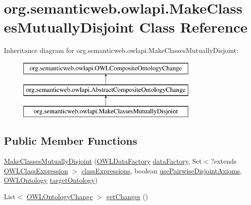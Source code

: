 \hypertarget{classorg_1_1semanticweb_1_1owlapi_1_1_make_classes_mutually_disjoint}{\section{org.\-semanticweb.\-owlapi.\-Make\-Classes\-Mutually\-Disjoint Class Reference}
\label{classorg_1_1semanticweb_1_1owlapi_1_1_make_classes_mutually_disjoint}
}
Inheritance diagram for org.\-semanticweb.\-owlapi.\-Make\-Classes\-Mutually\-Disjoint\-:\begin{figure}[H]
\begin{center}
\leavevmode
\includegraphics[height=3.000000cm]{classorg_1_1semanticweb_1_1owlapi_1_1_make_classes_mutually_disjoint}
\end{center}
\end{figure}
\subsection*{Public Member Functions}
\begin{DoxyCompactItemize}
\item 
\hyperlink{classorg_1_1semanticweb_1_1owlapi_1_1_make_classes_mutually_disjoint_a5b461cc70cf99348b88559f16c6c2e09}{Make\-Classes\-Mutually\-Disjoint} (\hyperlink{interfaceorg_1_1semanticweb_1_1owlapi_1_1model_1_1_o_w_l_data_factory}{O\-W\-L\-Data\-Factory} \hyperlink{classorg_1_1semanticweb_1_1owlapi_1_1_abstract_composite_ontology_change_aebcfd0601543ebb5f72b1fe53a5352c9}{data\-Factory}, Set$<$?extends \hyperlink{interfaceorg_1_1semanticweb_1_1owlapi_1_1model_1_1_o_w_l_class_expression}{O\-W\-L\-Class\-Expression} $>$ \hyperlink{classorg_1_1semanticweb_1_1owlapi_1_1_make_classes_mutually_disjoint_a57759e02e23e59ab2eeb7912773669bf}{class\-Expressions}, boolean \hyperlink{classorg_1_1semanticweb_1_1owlapi_1_1_make_classes_mutually_disjoint_a85748e7becd8aa020ef09bd443b3b5a3}{use\-Pairwise\-Disjoint\-Axioms}, \hyperlink{interfaceorg_1_1semanticweb_1_1owlapi_1_1model_1_1_o_w_l_ontology}{O\-W\-L\-Ontology} \hyperlink{classorg_1_1semanticweb_1_1owlapi_1_1_make_classes_mutually_disjoint_af9da9ae856c808194f95400759c74d58}{target\-Ontology})
\item 
List$<$ \hyperlink{classorg_1_1semanticweb_1_1owlapi_1_1model_1_1_o_w_l_ontology_change}{O\-W\-L\-Ontology\-Change} $>$ \hyperlink{classorg_1_1semanticweb_1_1owlapi_1_1_make_classes_mutually_disjoint_a05a24609c583b67f973c10bf0d3d2d24}{get\-Changes} ()
\end{DoxyCompactItemize}
